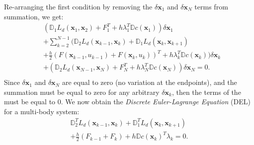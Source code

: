 \documentclass[conference]{IEEEtran}
\begin{document}
Re-arranging the first condition by removing the $\delta \mathbf{x}_1$ and 
$\delta \mathbf{x}_N$ terms from summation, we get:
\begin{equation}
\begin{aligned}
    &\left(\mathbb{D}_1 L_d(\mathbf{x}_1, \mathbf{x}_2) 
      + F_1^T + h \lambda_1^T \mathbb{D} c(\mathbf{x}_1) 
     \right) \delta \mathbf{x}_1 \\
    & +\sum_{k=2}^{N-1} \Big( \mathbb{D}_2 L_d(\mathbf{x}_{k-1}, \mathbf{x}_k) 
       + \mathbb{D}_1 L_d(\mathbf{x}_{k}, \mathbf{x}_{k+1}) \\
    &   + \frac{h}{2} (F(\mathbf{x}_{k-1}, u_{k-1}) + F(\mathbf{x}_k, u_k))^T 
                     + h \lambda_k^T \mathbb{D} c(\mathbf{x}_k) 
    \Big) \delta \mathbf{x}_k \\
    &+ \left(\mathbb{D}_2 L_d(\mathbf{x}_{N-1}, \mathbf{x}_N) 
     + F_N^T + h \lambda_N^T \mathbb{D}c(\mathbf{x}_N)\right) \delta \mathbf{x}_N = 0. \\
\end{aligned}
\end{equation}
Since $\delta \mathbf{x}_1$ and $\delta \mathbf{x}_N$ are equal to zero 
(no variation at the endpoints), and the summation must be equal to zero for any 
arbitrary $\delta \mathbf{x}_k$, then the terms of the must be equal to 0. We now obtain
the \textit{Discrete Euler-Lagrange Equation} (DEL) for a multi-body system:
\begin{multline}
    \mathbb{D}_2^T L_d(\mathbf{x}_{k-1}, \mathbf{x}_k)
       + \mathbb{D}_1^T L_d(\mathbf{x}_{k}, \mathbf{x}_{k+1}) \\
       + \frac{h}{2} (F_{k-1} + F_k) + h \mathbb{D} c(\mathbf{x}_k)^T \lambda_k  = 0.
\end{multline}
\end{document}
